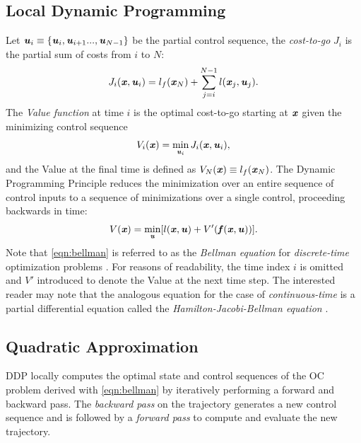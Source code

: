 \subsection{Local Dynamic Programming}
Let $\bm{\mathit{u}}_i\equiv\{\bm{\mathit{u}}_i,\bm{\mathit{u}}_{i+1}...,\bm{\mathit{u}}_{N-1}\}$ be the partial control sequence, the \textit{cost-to-go} $J_i$ is the partial sum of costs from $i$ to $N$: 
\begin{equation}\label{eqn:costToGo}
J_i(\bm{\mathit{x}}, \bm{\mathit{u}}_i)=l_f(\bm{\mathit{x}}_N)+\sum_{j=i}^{N-1}l(\bm{\mathit{x}}_j,\bm{\mathit{u}}_j).
\end{equation}
The \textit{Value function} at time $i$ is the optimal cost-to-go starting at $\bm{\mathit{x}}$ given the minimizing control sequence 
\begin{equation*}\label{eqn:value}
V_i(\bm{\mathit{x}})=\min_{\bm{\mathit{u}}_i}J_i(\bm{\mathit{x}}, \bm{\mathit{u}}_i),
\end{equation*}
and the Value at the final time is defined as $V_N(\bm{\mathit{x}})\equiv l_f(\bm{\mathit{x}}_N)$. The Dynamic Programming Principle \citep{bellman1966dynamic} reduces the minimization over an entire sequence of control inputs to a sequence of minimizations over a single control, proceeding backwards in time: 
\begin{equation}\label{eqn:bellman}
V(\bm{\mathit{x}})=\min_{\bm{\mathit{u}}}[l(\bm{\mathit{x}}, \bm{\mathit{u}})+V'(\bm{\mathit{f}}(\bm{\mathit{x}},\bm{\mathit{u}}))].
\end{equation}
Note that \cref{eqn:bellman} is referred to as the \textit{Bellman equation} for \textit{discrete-time} optimization problems \citep{kirk2004optimal}. For reasons of readability, the time index $i$ is omitted and $V'$ introduced to denote the Value at the next time step. The interested reader may note that the analogous equation for the case of \textit{continuous-time} is a partial differential equation called the \textit{Hamilton-Jacobi-Bellman equation} \citep{underactuatedCourse2020, kamien2012dynamic}.

\subsection{Quadratic Approximation}
\gls{DDP} locally computes the optimal state and control sequences of the \gls{OC} problem derived with \cref{eqn:bellman} by iteratively performing a forward and backward pass. The \textit{backward pass} on the trajectory generates a new control sequence and is followed by a \textit{forward pass} to compute and evaluate the new trajectory.

